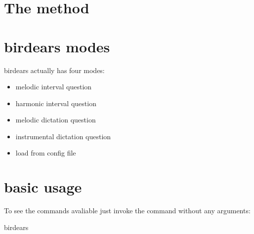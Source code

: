 \documentclass[letterpaper,10pt,english]{sphinxmanual}
\begin{document}
\section{The method}
\label{\detokenize{index:the-method}}


\section{birdears modes}
\label{\detokenize{index:birdears-modes}}
birdears actually has four modes:
\begin{itemize}
\item {} 
melodic interval question

\item {} 
harmonic interval question

\item {} 
melodic dictation question

\item {} 
instrumental dictation question

\item {} 
load from config file

\end{itemize}


\section{basic usage}
\label{\detokenize{index:basic-usage}}
To see the commands avaliable just invoke the command without any arguments:

\begin{sphinxVerbatim}[commandchars=\\\{\}]
birdears
\end{sphinxVerbatim}
\end{document}
